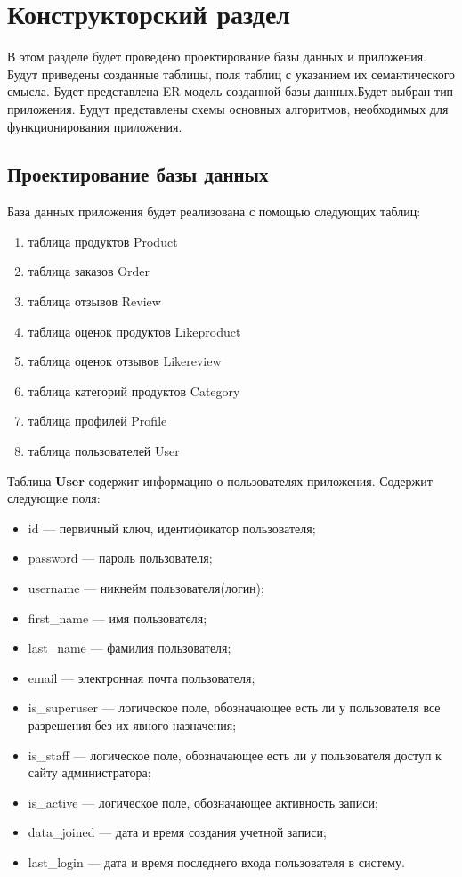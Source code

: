 \chapter{Конструкторский раздел}
В этом разделе будет проведено проектирование базы данных и приложения. Будут приведены созданные таблицы, поля таблиц с указанием их семантического смысла. Будет представлена ER-модель созданной базы данных.Будет выбран тип приложения. Будут представлены схемы основных алгоритмов, необходимых для функционирования приложения.

\section{Проектирование базы данных}

База данных приложения будет реализована с помощью следующих таблиц:

\begin{enumerate}
	\item таблица продуктов Product
	\item таблица заказов Order
	\item таблица отзывов Review
	\item таблица оценок продуктов Likeproduct
	\item таблица оценок отзывов Likereview
	\item таблица категорий продуктов Category
	\item таблица профилей Profile
	\item таблица пользователей User
\end{enumerate}

Таблица \textbf{User} содержит информацию о пользователях приложения. Содержит следующие поля:

\begin{itemize}
	\item id --- первичный ключ, идентификатор пользователя;
	\item password --- пароль пользователя;
	\item username --- никнейм пользователя(логин);
	\item first\_name --- имя пользователя;
	\item last\_name --- фамилия пользователя;
	\item email --- электронная почта пользователя;
	\item is\_superuser --- логическое поле, обозначающее есть ли у пользователя все разрешения без их явного назначения;
	\item is\_staff --- логическое поле, обозначающее есть ли у пользователя доступ к сайту администратора;
	\item is\_active --- логическое поле, обозначающее активность записи;
	\item data\_joined --- дата и время создания учетной записи;
	\item last\_login --- дата и время последнего входа пользователя в систему.
\end{itemize}


